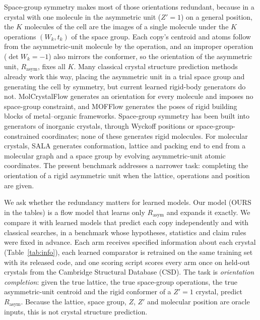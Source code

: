 \documentclass[journal=acsodf,manuscript=article]{achemso}
\begin{document}
Space-group symmetry makes most of those orientations redundant, because in a crystal with
one molecule in the asymmetric unit ($Z'=1$) on a general position, the $K$ molecules of
the cell are the images of a single molecule under the $K$ operations $(W_k, t_k)$ of the
space group. Each copy's centroid and atoms follow from the asymmetric-unit molecule by the
operation, and an improper operation ($\det W_k=-1$) also mirrors the conformer, so the
orientation of the asymmetric unit, $R_{\text{asym}}$, fixes all $K$. Many classical
crystal structure prediction methods already work this way, placing the asymmetric unit in
a trial space group and generating the cell by symmetry\cite{price2023blindtest7}, but
current learned rigid-body generators do not.
MolCrystalFlow\cite{zeng2026molcrystalflow} generates an orientation for every molecule
and imposes no space-group constraint, and MOFFlow\cite{kim2025mofflow} generates the poses
of rigid building blocks of metal--organic frameworks. Space-group symmetry has been built into
generators of inorganic crystals, through Wyckoff positions or space-group-constrained
coordinates\cite{jiao2024diffcsppp,wyckoffdiff2025,symmcd2025,puny2025sgfm,mu2026nextcrystal};
none of these generates rigid molecules. For molecular crystals, SALA\cite{cai2026sala}
generates conformation, lattice and packing end to end from a molecular graph and a space
group by evolving asymmetric-unit atomic coordinates. The present benchmark addresses a
narrower task: completing the orientation of a rigid asymmetric unit when the lattice,
operations and position are given.

We ask whether the redundancy matters for learned models. Our model (OURS in the tables)
is a flow model that learns only $R_{\text{asym}}$ and expands it exactly. We compare it
with learned models that predict each copy independently and with classical searches, in
a benchmark whose hypotheses, statistics and claim rules were fixed in advance. Each arm
receives specified information about each crystal (Table~\ref{tab:info}), each learned
comparator is retrained on the same training set with its released code, and one scoring
script scores every arm once on \nN{} held-out crystals from the Cambridge Structural
Database (CSD)\cite{groom2016csd}. The task is \emph{orientation completion}: given the
true lattice, the true space-group operations, the true asymmetric-unit centroid and the
rigid conformer of a $Z'=1$ crystal, predict $R_{\text{asym}}$. Because the lattice, space
group, $Z$, $Z'$ and molecular position are oracle inputs, this is not crystal structure
prediction.
\end{document}

